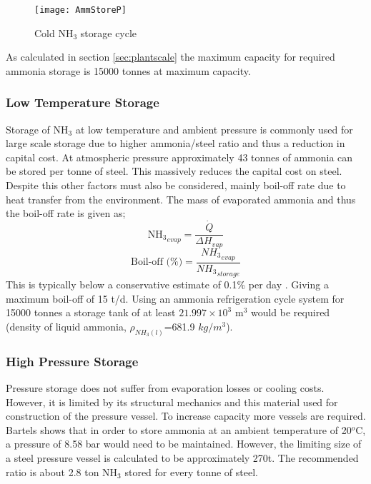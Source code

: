 \begin{wrapfigure}{r}{0.4\textwidth}
	\centering
	\texttt{[image: AmmStoreP]}
	\caption{Cold NH$_3$ storage cycle}
\end{wrapfigure}
As calculated in  section \ref{sec:plantscale} the maximum capacity for required ammonia storage is 15000 tonnes at maximum capacity.

\subsubsection{Low Temperature Storage}

Storage of NH$_3$ at low temperature and ambient pressure is commonly used for large scale storage due to higher ammonia/steel ratio and thus a reduction in capital cost. At atmospheric pressure approximately 43 tonnes of ammonia can be stored per tonne of steel. This massively reduces the capital cost on steel. Despite this other factors must also be considered, mainly boil-off rate due to heat transfer from the environment. The mass of evaporated ammonia and thus the boil-off rate is given as;
\begin{equation}
{\text{NH}_3}_{evap} = \frac{\dot{Q}}{\Delta H_{vap}}
\end{equation}
\begin{equation}
\text{Boil-off (\%)} = \frac{{NH_3}_{evap} }{{NH_3}_{storage} }
\end{equation}
This is typically below a conservative estimate of 0.1\% per day \cite{Belapurkar2016}. Giving a maximum boil-off of 15 t/d. Using an ammonia refrigeration cycle system for 15000 tonnes a storage tank of at least $21.997\times10^3$ m$^3$ would be required (density of liquid ammonia, $\rho_{NH_3(l)}$=681.9 $kg/m^3$)\cite{Hacker2003}. 

\subsubsection{High Pressure Storage}

Pressure storage does not suffer from evaporation losses or cooling costs. However, it is limited by its structural mechanics and this material used for construction of the pressure vessel. To increase capacity more vessels are required. Bartels shows that in order to store ammonia at an ambient temperature of 20$^o$C, a pressure of 8.58 bar would need to be maintained. However, the limiting size of a steel pressure vessel is calculated to be approximately 270t. The recommended ratio is about 2.8 ton NH$_3$ stored for every tonne of steel. 

